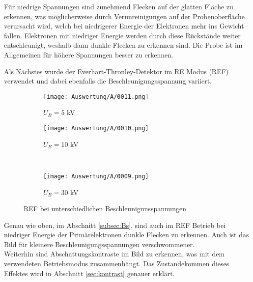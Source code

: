 Für niedrige Spannungen sind zunehmend Flecken auf der glatten Fläche zu erkennen, was möglicherweise durch Verunreinigungen auf der Probenoberfläche verursacht wird, welch bei niedrigerer Energie der Elektronen mehr ins Gewicht fallen. Elektronen mit niedriger Energie werden durch diese Rückstände weiter entschleunigt, weshalb dann dunkle Flecken zu erkennen sind. Die Probe ist im Allgemeinen für höhere Spannungen besser zu erkennen.

\newpage
Als Nächstes wurde der Everhart-Thronley-Detektor im RE Modus (REF) verwendet und dabei ebenfalls die Beschleunigungsspannung variiert.
\begin{figure}[h]
    \centering
    
    \begin{subfigure}[b]{0.45\textwidth}
        \centering
        \texttt{[image: Auswertung/A/0011.png]}
        \caption{$U_B = 5$ kV}
    \end{subfigure}
    \hfill
    \begin{subfigure}[b]{0.45\textwidth}
        \centering
        \texttt{[image: Auswertung/A/0010.png]}
        \caption{$U_B = 10$ kV}
    \end{subfigure}
    \\
    \begin{subfigure}[b]{0.45\textwidth}
        \centering
        \texttt{[image: Auswertung/A/0009.png]}
        \caption{$U_B = 30$ kV}
    \end{subfigure}
    \caption{REF bei unterschiedlichen Beschleunigunsspannungen}
\end{figure}

Genau wie oben, im Abschnitt \ref{subsec:Bs}, sind auch im REF Betrieb bei niedriger Energie der Primärelektronen dunkle Flecken zu erkennen. Auch ist das Bild für kleinere Beschleunigungsspannungen verschwommener.\\
Weiterhin sind Abschattungskontraste im Bild zu erkennen, was mit dem verwendeten Betriebsmodus zusammenhängt. Das Zustandekommen dieses Effektes wird in Abschnitt \ref{sec:kontrast} genauer erklärt. \\


